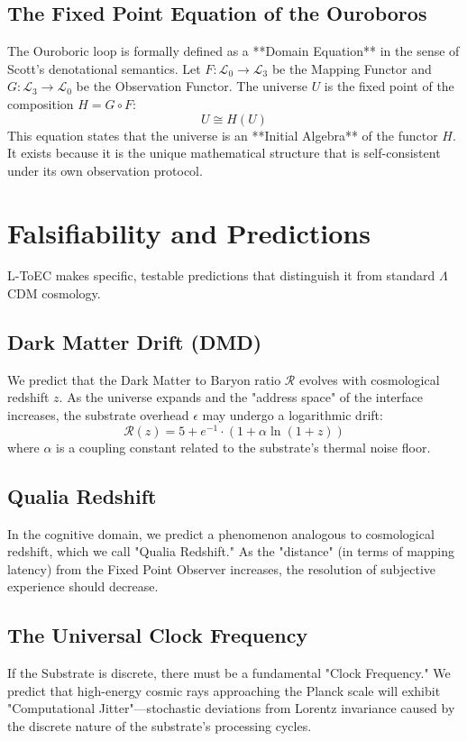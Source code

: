 \documentclass[11pt,titlepage]{article}
\newcommand{\substrate}{\mathcal{L}_0}
\newcommand{\interface}{\mathcal{L}_3}
\begin{document}
\subsection{The Fixed Point Equation of the Ouroboros}
The Ouroboric loop is formally defined as a **Domain Equation** in the sense of Scott's denotational semantics. Let $F: \substrate \to \interface$ be the Mapping Functor and $G: \interface \to \substrate$ be the Observation Functor. The universe $U$ is the fixed point of the composition $H = G \circ F$:
\begin{equation}
U \cong H(U)
\end{equation}
This equation states that the universe is an **Initial Algebra** of the functor $H$. It exists because it is the unique mathematical structure that is self-consistent under its own observation protocol.


\section{Falsifiability and Predictions}
\label{sec:predictions}
L-ToEC makes specific, testable predictions that distinguish it from standard $\Lambda$CDM cosmology.

\subsection{Dark Matter Drift (DMD)}
We predict that the Dark Matter to Baryon ratio $\mathcal{R}$ evolves with cosmological redshift $z$. As the universe expands and the "address space" of the interface increases, the substrate overhead $\epsilon$ may undergo a logarithmic drift:
\begin{equation}
\mathcal{R}(z) = 5 + e^{-1} \cdot (1 + \alpha \ln(1+z))
\end{equation}
where $\alpha$ is a coupling constant related to the substrate's thermal noise floor.

\subsection{Qualia Redshift}
In the cognitive domain, we predict a phenomenon analogous to cosmological redshift, which we call "Qualia Redshift." As the "distance" (in terms of mapping latency) from the Fixed Point Observer increases, the resolution of subjective experience should decrease.

\subsection{The Universal Clock Frequency}
If the Substrate is discrete, there must be a fundamental "Clock Frequency." We predict that high-energy cosmic rays approaching the Planck scale will exhibit "Computational Jitter"---stochastic deviations from Lorentz invariance caused by the discrete nature of the substrate's processing cycles.
\end{document}
